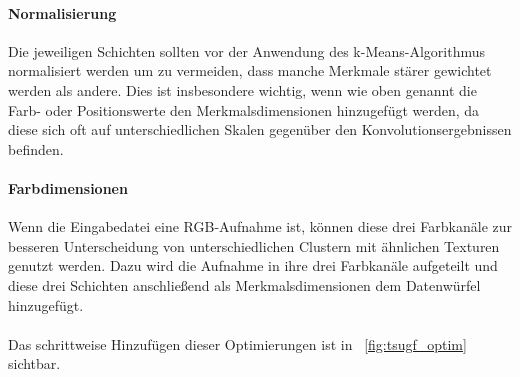 \paragraph{Normalisierung}
Die jeweiligen Schichten sollten vor der Anwendung des k-Means-Algorithmus normalisiert werden um zu vermeiden, dass manche Merkmale stärer gewichtet werden als andere. Dies ist insbesondere wichtig, wenn wie oben genannt die Farb- oder Positionswerte den Merkmalsdimensionen hinzugefügt werden, da diese sich oft auf unterschiedlichen Skalen gegenüber den Konvolutionsergebnissen befinden.
\paragraph{Farbdimensionen}
Wenn die Eingabedatei eine RGB-Aufnahme ist, können diese drei Farbkanäle zur besseren Unterscheidung von unterschiedlichen Clustern mit ähnlichen Texturen genutzt werden. Dazu wird die Aufnahme in ihre drei Farbkanäle aufgeteilt und diese drei Schichten anschließend als Merkmalsdimensionen dem Datenwürfel hinzugefügt.

\paragraph{}
Das schrittweise Hinzufügen dieser Optimierungen ist in \figurename~\ref{fig:tsugf_optim} sichtbar.

